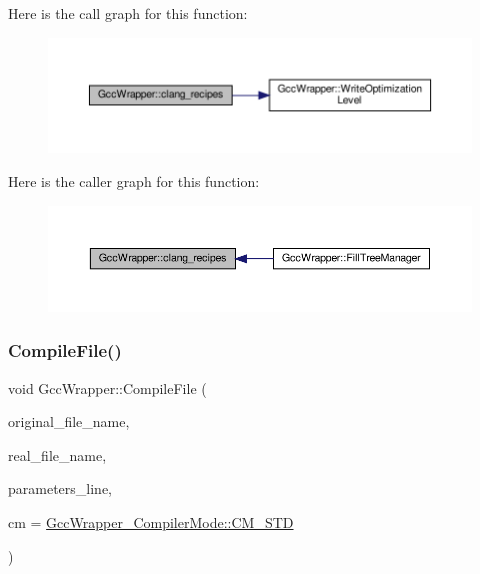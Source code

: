 Here is the call graph for this function\+:
\nopagebreak
\begin{figure}[H]
\begin{center}
\leavevmode
\includegraphics[width=350pt]{d4/dbf/classGccWrapper_a22a070d6d7a5770090dc5a119e4fc0bc_cgraph}
\end{center}
\end{figure}
Here is the caller graph for this function\+:
\nopagebreak
\begin{figure}[H]
\begin{center}
\leavevmode
\includegraphics[width=350pt]{d4/dbf/classGccWrapper_a22a070d6d7a5770090dc5a119e4fc0bc_icgraph}
\end{center}
\end{figure}
\mbox{\label{classGccWrapper_a8cd41a8c53b37b900efb3363a9612bdc}} 
\subsubsection{\texorpdfstring{Compile\+File()}{CompileFile()}}
{\footnotesize\ttfamily void Gcc\+Wrapper\+::\+Compile\+File (\begin{DoxyParamCaption}\item[{const std\+::string \&}]{original\+\_\+file\+\_\+name,  }\item[{std\+::string \&}]{real\+\_\+file\+\_\+name,  }\item[{const std\+::string \&}]{parameters\+\_\+line,  }\item[{\hyperlink{gcc__wrapper_8hpp_a6625f9f7120deee0b77a8179ae2a7fe9}{Gcc\+Wrapper\+\_\+\+Compiler\+Mode}}]{cm = {\ttfamily \hyperlink{gcc__wrapper_8hpp_a6625f9f7120deee0b77a8179ae2a7fe9a1cce81afdcb3d459d409b402ef97749f}{Gcc\+Wrapper\+\_\+\+Compiler\+Mode\+::\+C\+M\+\_\+\+S\+TD}} }\end{DoxyParamCaption})\hspace{0.3cm}{\ttfamily [private]}}



